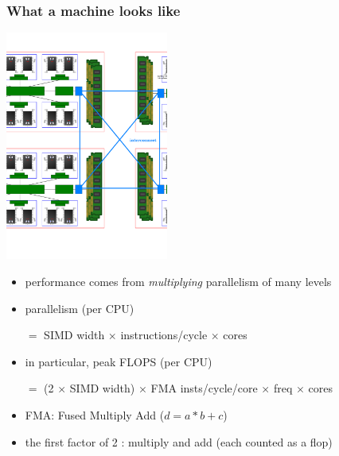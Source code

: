 \documentclass[12pt,dvipdfmx]{beamer}
\newcommand{\ao}[1]{{\color{blue}#1}}
\begin{document}
\begin{frame}
\frametitle{What a machine looks like}
\includegraphics[width=0.40\textwidth]{out/pdf/svg/diagram_multisocket.pdf} \hspace{0.05\textwidth} \def\svgwidth{0.45\textwidth} %

\begin{itemize}
\item performance comes from \ao{\textit{multiplying}} parallelism of many levels
\item parallelism (per CPU)
\begin{center}
$=$ SIMD width $\times$ instructions/cycle $\times$ cores 
\end{center}
\item in particular, peak FLOPS (per CPU)
\begin{center}
$=$ (2 $\times$ SIMD width) $\times$ FMA insts/cycle/core $\times$ freq $\times$ cores
\end{center}
\item FMA: Fused Multiply Add ($d = a * b + c$)
\item the first factor of 2 : multiply and add (each counted as a flop)
\end{itemize}
\end{frame}

\end{document}
